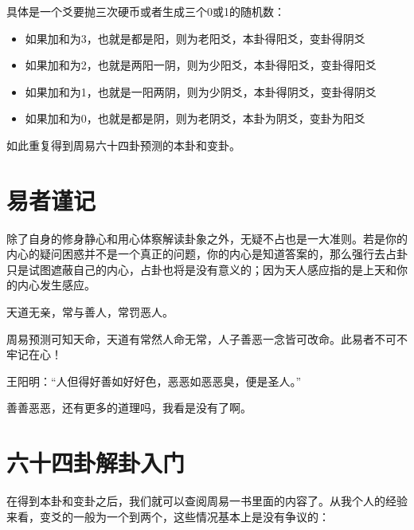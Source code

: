 \documentclass[12pt,oneside]{book}
\begin{document}
具体是一个爻要抛三次硬币或者生成三个0或1的随机数：

\begin{itemize}
\item 如果加和为3，也就是都是阳，则为老阳爻，本卦得阳爻，变卦得阴爻
\item 如果加和为2，也就是两阳一阴，则为少阳爻，本卦得阳爻，变卦得阳爻
\item 如果加和为1，也就是一阳两阴，则为少阴爻，本卦得阴爻，变卦得阴爻
\item 如果加和为0，也就是都是阴，则为老阴爻，本卦为阴爻，变卦为阳爻
\end{itemize}


如此重复得到周易六十四卦预测的本卦和变卦。

\section{易者谨记}
除了自身的修身静心和用心体察解读卦象之外，无疑不占也是一大准则。若是你的内心的疑问困惑并不是一个真正的问题，你的内心是知道答案的，那么强行去占卦只是试图遮蔽自己的内心，占卦也将是没有意义的；因为天人感应指的是上天和你的内心发生感应。

天道无亲，常与善人，常罚恶人。

周易预测可知天命，天道有常然人命无常，人子善恶一念皆可改命。此易者不可不牢记在心！

王阳明：“人但得好善如好好色，恶恶如恶恶臭，便是圣人。”

善善恶恶，还有更多的道理吗，我看是没有了啊。





\section{六十四卦解卦入门}
在得到本卦和变卦之后，我们就可以查阅周易一书里面的内容了。从我个人的经验来看，变爻的一般为一个到两个，这些情况基本上是没有争议的：
\end{document}
